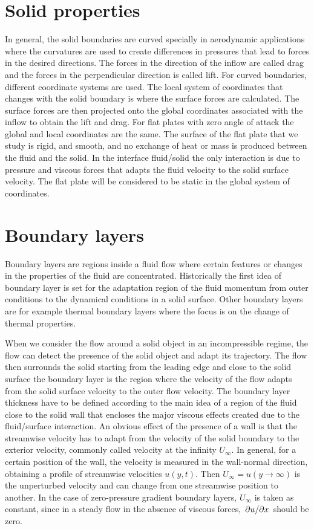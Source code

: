 \section{Solid properties}
In general, the solid boundaries are curved specially in aerodynamic applications where the curvatures are used to create differences in pressures that lead to forces in the desired directions. The forces in the direction of the inflow are called drag and the forces in the perpendicular direction is called lift. For curved boundaries, different coordinate systems are used. The local system of coordinates that changes with the solid boundary is where the surface forces are calculated. The surface forces are then projected onto the global coordinates associated with the inflow to obtain the lift and drag.
For flat plates with zero angle of attack the global and local coordinates are the same.
The surface of the flat plate that we study is rigid, and smooth, and no exchange of heat or mass is produced between the fluid and the solid. In the interface fluid/solid the only interaction is due to pressure and viscous forces that adapts the fluid velocity to the solid surface velocity.
The flat plate will be considered to be static in the global system of coordinates.


\section{Boundary layers}

Boundary layers are regions inside a fluid flow where certain features or changes in the properties of the fluid are concentrated. Historically the first idea of boundary layer is set for the adaptation region of the fluid momentum from outer conditions to the dynamical conditions in a solid surface.
Other boundary layers are for example thermal boundary layers where the focus is on the change of thermal properties.

When we consider the flow around a solid object in an incompressible regime, the flow can detect the presence of the solid object and adapt its trajectory. The flow then surrounds the solid starting from the leading edge and close to the solid surface the boundary layer is the region where the velocity of the flow adapts from the solid surface velocity to the outer flow velocity. The boundary layer thickness have to be defined according to the main idea of a region of the fluid close to the solid wall that encloses the major viscous effects created due to the fluid/surface interaction. An obvious effect of the presence of a wall is that the streamwise velocity has to adapt from the velocity of the solid boundary to the exterior velocity, commonly called velocity at the infinity $U_{\infty}$. 
In general, for a certain position of the wall, the velocity is measured in the wall-normal direction, obtaining a profile of streamwise velocities $u(y,t)$. Then $U_{\infty}=u(y\rightarrow \infty)$ is the unperturbed velocity and can change from one streamwise position to another.
In the case of zero-pressure gradient boundary layers, $U_{\infty}$ is taken as constant, since in a steady flow in the absence of viscous forces, $\pdv{u}/{x}$ should be zero. 

